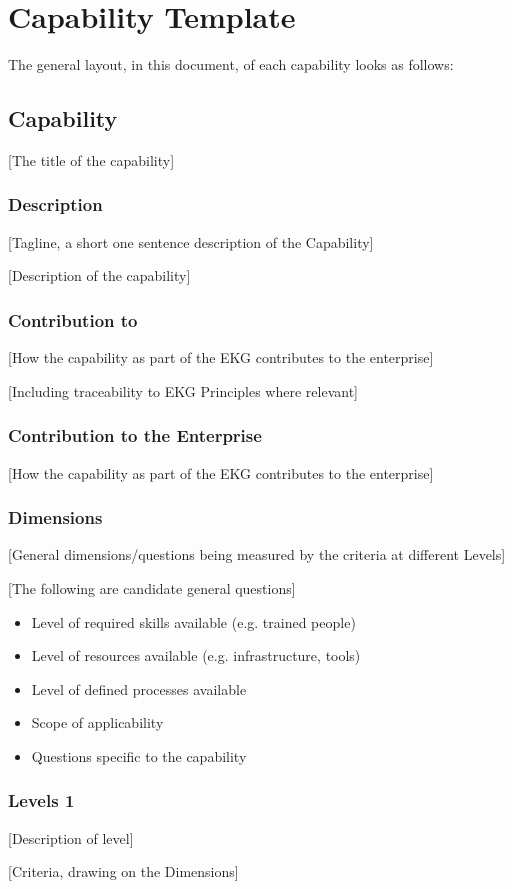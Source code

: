 \section{Capability Template}

The general layout, in this document, of each capability looks as follows:

\subsection*{Capability}

[The title of the capability]

\subsubsection*{Description}

[Tagline, a short one sentence description of the Capability]

[Description of the capability]

\subsubsection*{Contribution to }

[How the capability as part of the EKG contributes to the enterprise]

[Including traceability to EKG Principles where relevant]

\subsubsection*{Contribution to the Enterprise}

[How the capability as part of the EKG contributes to the enterprise]

\subsubsection*{Dimensions}

[General dimensions/questions being measured by the criteria at different Levels]

[The following are candidate general questions]

\begin{itemize}
    \item Level of required skills available (e.g. trained people)
    \item Level of resources available (e.g. infrastructure, tools)
    \item Level of defined processes available
    \item Scope of applicability
    \item Questions specific to the capability
\end{itemize}

\subsubsection*{Levels 1 }

[Description of level]

[Criteria, drawing on the Dimensions]
